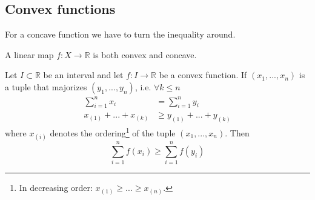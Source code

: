 \subsection{Convex functions}
	
	\begin{remark}
		For a concave function we have to turn the inequality around.
	\end{remark}
	\begin{result}
		A linear map $f:X\rightarrow\mathbb{R}$ is both convex and concave.
	\end{result}
	
	\begin{theorem}
		Let $I\subset\mathbb{R}$ be an interval and let $f:I\rightarrow\mathbb{R}$ be a convex function. If $(x_1, ..., x_n)$ is a tuple that majorizes $(y_1, ..., y_n)$, i.e. $\forall k\leq n$
		\begin{align}
			\sum_{i=1}^nx_i &= \sum_{i=1}^ny_i\\
			x_{(1)} + ... + x_{(k)}&\geq y_{(1)} + ... + y_{(k)}
		\end{align}
		where $x_{(i)}$ denotes the ordering\footnote{In decreasing order: $x_{(1)}\geq...\geq x_{(n)}$.} of the tuple $(x_1, ..., x_n)$. Then
		\begin{equation}
			\sum_{i=1}^nf(x_i)\geq \sum_{i=1}^nf(y_i)
		\end{equation}
	\end{theorem}
